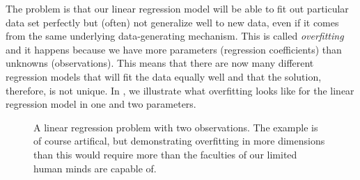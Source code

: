 The problem is that our linear regression model will be able to fit out particular data set perfectly but (often) not generalize well to new data, even if it comes from the same underlying data-generating mechanism. This is called \emph{overfitting} and it happens because we have more parameters (regression coefficients) than unknowns (observations). This means that there are now many different regression models that will fit the data equally well and that the solution, therefore, is not unique. In , we illustrate what overfitting looks like for the linear regression model in one and two parameters.

\begin{figure}
  \centering
  \hfill%
  \caption{%
    A linear regression problem with two observations. The example is of course artifical, but demonstrating overfitting in more dimensions than this would require more than the faculties of our limited human minds are capable of.
  }
  \label{fig:overfitting}
\end{figure}

